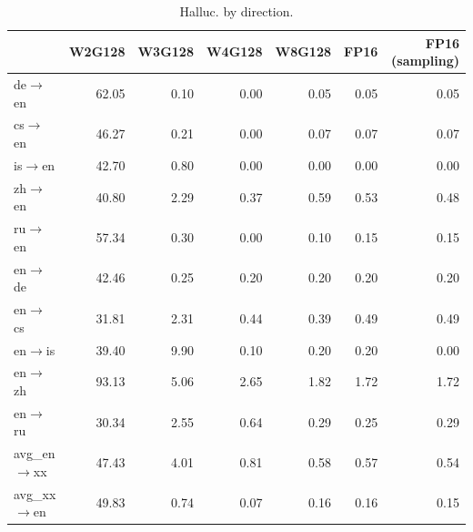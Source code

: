 \begin{table}[t]
\centering
\small
\begin{tabular}{lrrrrrr}
\toprule
& W2G128 & W3G128 & W4G128 & W8G128 & FP16 & FP16 (sampling) \\
\midrule
de$\rightarrow$en & 62.05 & 0.10 & 0.00 & 0.05 & 0.05 & 0.05 \\
cs$\rightarrow$en & 46.27 & 0.21 & 0.00 & 0.07 & 0.07 & 0.07 \\
is$\rightarrow$en & 42.70 & 0.80 & 0.00 & 0.00 & 0.00 & 0.00 \\
zh$\rightarrow$en & 40.80 & 2.29 & 0.37 & 0.59 & 0.53 & 0.48 \\
ru$\rightarrow$en & 57.34 & 0.30 & 0.00 & 0.10 & 0.15 & 0.15 \\
en$\rightarrow$de & 42.46 & 0.25 & 0.20 & 0.20 & 0.20 & 0.20 \\
en$\rightarrow$cs & 31.81 & 2.31 & 0.44 & 0.39 & 0.49 & 0.49 \\
en$\rightarrow$is & 39.40 & 9.90 & 0.10 & 0.20 & 0.20 & 0.00 \\
en$\rightarrow$zh & 93.13 & 5.06 & 2.65 & 1.82 & 1.72 & 1.72 \\
en$\rightarrow$ru & 30.34 & 2.55 & 0.64 & 0.29 & 0.25 & 0.29 \\
\midrule
avg\_en$\rightarrow$xx & 47.43 & 4.01 & 0.81 & 0.58 & 0.57 & 0.54 \\
avg\_xx$\rightarrow$en & 49.83 & 0.74 & 0.07 & 0.16 & 0.16 & 0.15 \\
\bottomrule
\end{tabular}
\caption{Halluc. by direction.}
\label{tab:halluc}
\end{table}

